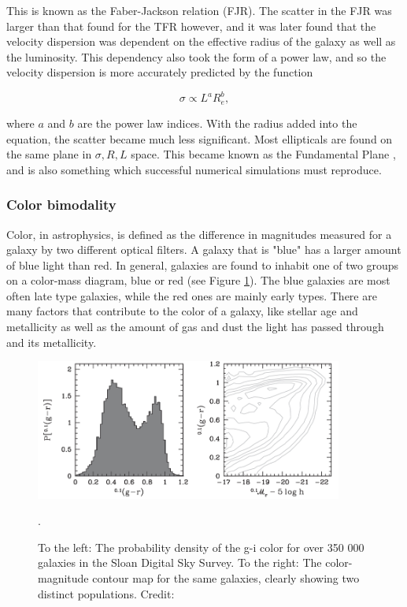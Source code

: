 This is known as the Faber-Jackson relation (FJR). The scatter in the FJR was larger than that found for the TFR however, and it was later found that the velocity dispersion was dependent on the effective radius of the galaxy as well as the luminosity. This dependency also took the form of a power law, and so the velocity dispersion is more accurately predicted by the function

\begin{equation}
    \sigma \propto L^a R_e^b,
\end{equation}

where $a$ and $b$ are the power law indices. With the radius added into the equation, the scatter became much less significant. Most ellipticals are found on the same plane in ${\sigma, R, L}$ space. This became known as the Fundamental Plane \parencite{Djorgovski1987}, and is also something which successful numerical simulations must reproduce.

\subsubsection{Color bimodality}
Color, in astrophysics, is defined as the difference in magnitudes measured for a galaxy by two different optical filters. A galaxy that is "blue" has a larger amount of blue light than red. In general, galaxies are found to inhabit one of two groups on a color-mass diagram, blue or red (see Figure \ref{color_bimodality}). The blue galaxies are most often late type galaxies, while the red ones are mainly early types. There are many factors that contribute to the color of a galaxy, like stellar age and metallicity as well as the amount of gas and dust the light has passed through and its metallicity.

\begin{figure}
    \centering
    \includegraphics[width=0.9\textwidth]{images/color_bimodality.png}
    \caption{To the left: The probability density of the g-i color for over 350 000 galaxies in the Sloan Digital Sky Survey. To the right: The color-magnitude contour map for the same galaxies, clearly showing two distinct populations. Credit: \textcite{Mo2010}}.
    \label{color_bimodality}
\end{figure}
